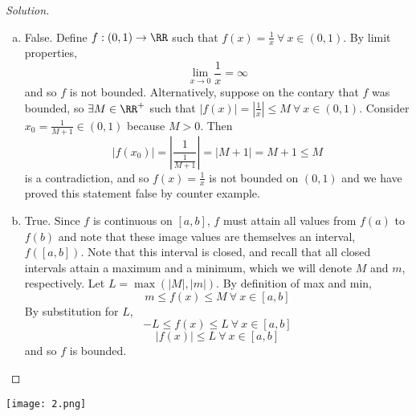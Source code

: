\documentclass[12pt]{scrartcl}
\begin{document}
\begin{proof}[Solution]
\begin{enumerate}[a.]
  
  \item False. Define $f: (0, 1) \to \RR$ such that $f(x) = \frac{1}{x} \ \forall \ x \in (0, 1)$. By limit properties, 
  \[\lim_{x \to 0} \frac{1}{x} = \infty\]
  and so $f$ is not bounded. Alternatively, suppose on the contary that $f$ was bounded, so $\exists M \in \RR^+$ such that 
  $|f(x)| = |\frac{1}{x}| \leq M \ \forall \ x \in (0, 1)$. Consider $x_0 = \frac{1}{M + 1} \in (0, 1)$ because $M > 0$.
  Then
  \[|f(x_0)| = |\frac{1}{\frac{1}{M + 1}}| = |M + 1| = M + 1 \leq M\]
  is a contradiction, and so $f(x) = \frac{1}{x}$ is not bounded on $(0, 1)$ and we have proved this statement false by counter example.
  
  \item True. Since $f$ is continuous on $[a,b]$, $f$ must attain all values from $f(a)$ to $f(b)$ and note that these image 
  values are themselves an interval, $f([a, b])$. Note that this interval is closed, and recall that all closed intervals attain a maximum
  and a minimum, which we will denote $M$ and $m$, respectively. Let $L = \max(|M|, |m|)$. By definition of max and min,
  \[m \leq f(x) \leq M \ \forall \ x \in [a,b]\]
  By substitution for $L$, 
  \[-L \leq f(x) \leq L \ \forall \ x \in [a,b]\]
  \[|f(x)| \leq L \ \forall \ x \in [a,b]\]
  and so $f$ is bounded.
\end{enumerate}
  
\end{proof}

\newpage

\texttt{[image: 2.png]}
\end{document}
